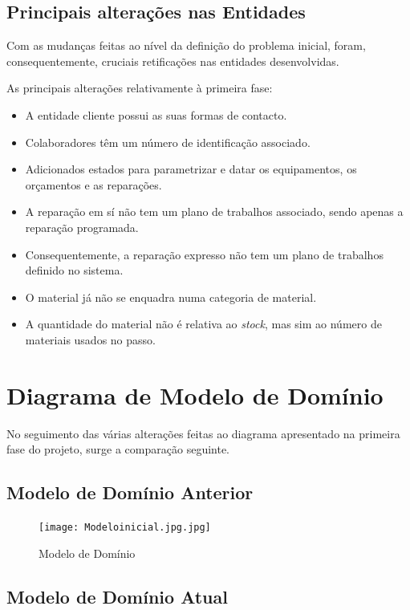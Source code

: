 \documentclass[a4paper,12pt]{scrreprt}
\begin{document}
\subsection{Principais alterações nas Entidades}
Com as mudanças feitas ao nível da definição do problema inicial, foram, consequentemente, cruciais retificações nas entidades
desenvolvidas.

As principais alterações relativamente à primeira fase: 
\begin{itemize}
    \item A entidade cliente possui as suas formas de contacto.
    \item Colaboradores têm um número de identificação associado. 
    \item Adicionados estados para parametrizar e datar os equipamentos, os orçamentos e as reparações.
    \item A reparação em sí não tem um plano de trabalhos associado, sendo apenas a reparação programada.
    \item Consequentemente, a reparação expresso não tem um plano de trabalhos definido no sistema.
    \item O material já não se enquadra numa categoria de material.
    \item A quantidade do material não é relativa ao \textit{stock}, mas sim ao número de materiais usados no passo.
\end{itemize}

\section{Diagrama de Modelo de Domínio}

No seguimento das várias alterações feitas ao diagrama apresentado na primeira fase do projeto, surge a comparação seguinte.

\subsection{Modelo de Domínio Anterior} 

\begin{figure}[!ht]
    \centering
    \texttt{[image: Modeloinicial.jpg.jpg]}
    \caption{Modelo de Domínio}
\end{figure}

\subsection{Modelo de Domínio Atual}
\end{document}

